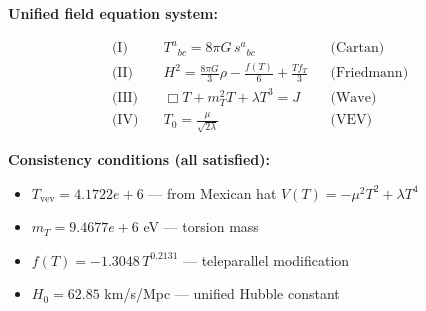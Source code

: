 
\textbf{Unified field equation system:}

\begin{align}
  \text{(I)} \quad & T^a{}_{bc} = 8\pi G \, s^a{}_{bc} && \text{(Cartan)} \\
  \text{(II)} \quad & H^2 = \frac{8\pi G}{3}\rho - \frac{f(T)}{6} + \frac{Tf_T}{3} && \text{(Friedmann)} \\
  \text{(III)} \quad & \Box T + m_T^2 T + \lambda T^3 = J && \text{(Wave)} \\
  \text{(IV)} \quad & T_0 = \frac{\mu}{\sqrt{2\lambda}} && \text{(VEV)}
\end{align}

\textbf{Consistency conditions (all satisfied):}
\begin{itemize}
  \item $T_{\text{vev}} = 4.1722e+6$ — from Mexican hat $V(T) = -\mu^2 T^2 + \lambda T^4$
  \item $m_T = 9.4677e+6$ eV — torsion mass
  \item $f(T) = -1.3048 \, T^{0.2131}$ — teleparallel modification
  \item $H_0 = 62.85$ km/s/Mpc — unified Hubble constant
\end{itemize}